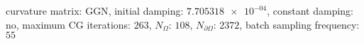 curvature matrix: $\text{GGN}$, initial damping: $\num[scientific-notation=true]{7.705318e-04}$, constant damping: $\text{no}$, maximum CG iterations: $\num[scientific-notation=false]{263}$, $N_{\Omega}$: $\num[scientific-notation=false]{108}$, $N_{\partial\Omega}$: $\num[scientific-notation=false]{2372}$, batch sampling frequency: $\num[scientific-notation=false]{55}$